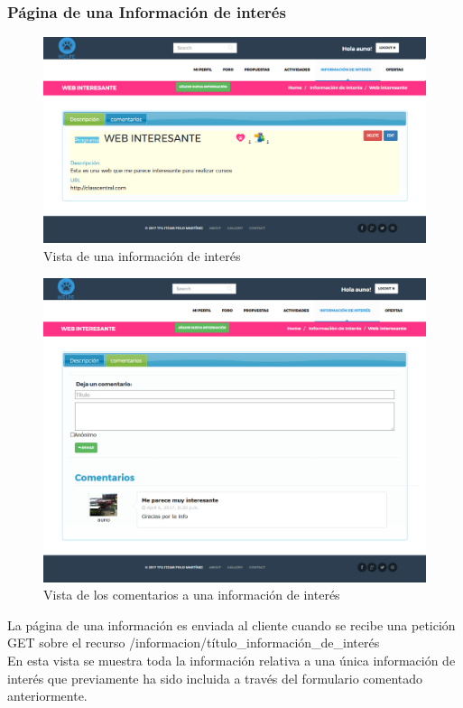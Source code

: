 \subsubsection{Página de una Información de interés }
\label{subsubsec:informacion}
\begin{figure}[H]
\centering
\includegraphics[width=12cm]{img/info_interes}
\caption{Vista de una información de interés}
\label{figura:info_interes}
\end{figure}
\begin{figure}[H]
\centering
\includegraphics[width=12cm]{img/info_interes_comment}
\caption{Vista de los comentarios a una información de interés}
\label{figura:info_interes_comment}
\end{figure}
La página de una información es enviada al cliente cuando se recibe una petición GET sobre el recurso /informacion/{título\_información\_de\_interés}\\
En esta vista se muestra toda la información relativa a una única información de interés que previamente ha sido incluida a través del formulario comentado anteriormente. \\
